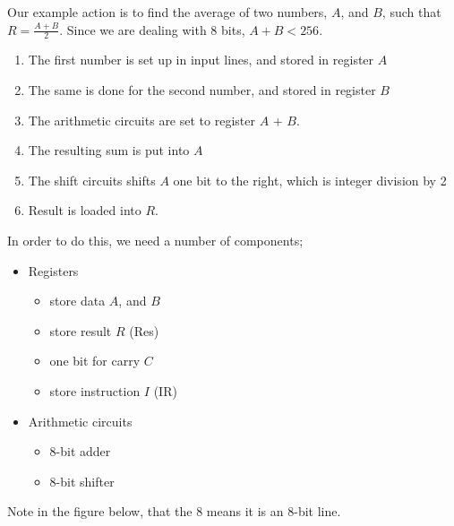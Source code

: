\documentclass[a4paper, 12pt]{article}
\begin{document}
            Our example action is to find the average of two numbers, $A$, and $B$, such that $R = \frac{A + B}{2}$. Since we are dealing with 8 bits, $A + B < 256$.
            \begin{enumerate}[1.]
                \itemsep0em
                \item The first number is set up in input lines, and stored in register $A$
                \item The same is done for the second number, and stored in register $B$
                \item The arithmetic circuits are set to register $A$ + $B$.
                \item The resulting sum is put into $A$
                \item The shift circuits shifts $A$ one bit to the right, which is integer division by 2
                \item Result is loaded into $R$.
            \end{enumerate}
            In order to do this, we need a number of components;
            \begin{itemize}
                \itemsep0em
                \item Registers
                    \begin{itemize}
                        \itemsep0em
                        \item store data $A$, and $B$
                        \item store result $R$ (Res)
                        \item one bit for carry $C$
                        \item store instruction $I$ (IR)
                    \end{itemize}
                \item Arithmetic circuits
                    \begin{itemize}
                        \itemsep0em
                        \item 8-bit adder
                        \item 8-bit shifter
                    \end{itemize}
            \end{itemize}
            Note in the figure below, that the 8 means it is an 8-bit line.
\end{document}
